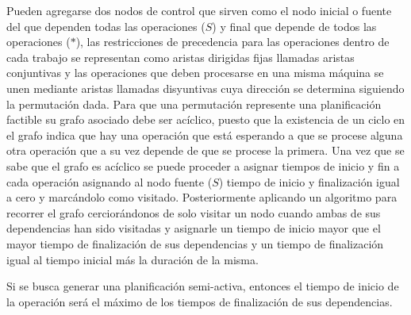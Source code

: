 Pueden agregarse dos nodos de control que sirven como el nodo inicial o fuente del que dependen todas las operaciones ($S$) y final que depende de todos las operaciones ($*$), las restricciones de precedencia para las operaciones dentro de cada trabajo se representan como aristas dirigidas fijas llamadas aristas conjuntivas y las operaciones que deben procesarse en una misma máquina se unen mediante aristas llamadas disyuntivas cuya dirección se determina siguiendo la permutación dada. 
%
Para que una permutación represente una planificación factible su grafo asociado debe ser acíclico, puesto que la existencia de un ciclo en el grafo indica que hay una operación que está esperando a que se procese alguna otra operación que a su vez depende de que se procese la primera.
%
Una vez que se sabe que el grafo es acíclico se puede proceder a asignar tiempos de inicio y fin a cada operación asignando al nodo fuente ($S$) tiempo de inicio y finalización igual a cero y marcándolo como visitado. Posteriormente aplicando un algoritmo para recorrer el grafo cerciorándonos de solo visitar un nodo cuando ambas de sus dependencias han sido visitadas y asignarle un tiempo de inicio mayor que el mayor tiempo de finalización de sus dependencias y un tiempo de finalización igual al tiempo inicial más la duración de la misma.

Si se busca generar una planificación semi-activa, entonces el tiempo de inicio de la operación será el máximo de los tiempos de finalización de sus dependencias.

